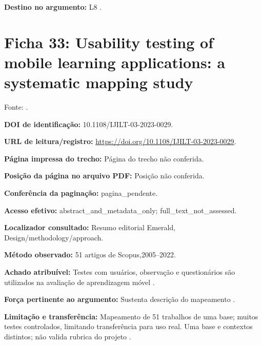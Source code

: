 \noindent\textbf{Destino no argumento:} L8 .

\clearpage\section*{Ficha 33: Usability testing of mobile learning applications: a systematic mapping study}

Fonte: \citet{kumarmapping2024}.

\noindent\textbf{DOI de identificação:} 10.1108/IJILT-03-2023-0029.\par\medskip

\noindent\textbf{URL de leitura/registro:} \url{https://doi.org/10.1108/IJILT-03-2023-0029}.\par\medskip

\noindent\textbf{Página impressa do trecho:} Página do trecho não conferida.\par\medskip

\noindent\textbf{Posição da página no arquivo PDF:} Posição não conferida.\par\medskip

\noindent\textbf{Conferência da paginação:} pagina\_pendente.\par\medskip

\noindent\textbf{Acesso efetivo:} abstract\_and\_metadata\_only; full\_text\_not\_assessed.\par\medskip

\noindent\textbf{Localizador consultado:} Resumo editorial Emerald, Design/methodology/approach.\par\medskip

\noindent\textbf{Método observado:} 51 artigos de Scopus,2005–2022.\par\medskip

\noindent\textbf{Achado atribuível:} Testes com usuários, observação e questionários são utilizados na avaliação de aprendizagem móvel \citep{kumarmapping2024}.\par\medskip

\noindent\textbf{Força pertinente ao argumento:} Sustenta descrição do mapeamento \citep{kumarmapping2024}.\par\medskip

\noindent\textbf{Limitação e transferência:} Mapeamento de 51 trabalhos de uma base; muitos testes controlados, limitando transferência para uso real. Uma base e contextos distintos; não valida rubrica do projeto \citep{kumarmapping2024}.\par\medskip


